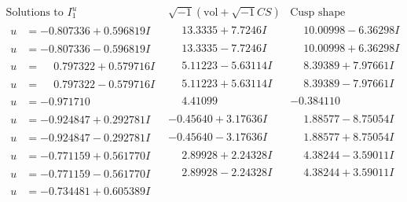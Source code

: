 \documentclass[1p]{elsarticle_modified}
\theoremstyle{definition}
\newcommand{\I}{\sqrt{-1}}
\begin{document}
$$\begin{array}{c|c|c}  
\text{Solutions to }I^u_{1}& \I (\text{vol} + \sqrt{-1}CS) & \text{Cusp shape}\\
 \hline 
\begin{aligned}
u &= -0.807336 + 0.596819 I\end{aligned}
 & \phantom{-}13.3335 + 7.7246 I & \phantom{-}10.00998 - 6.36298 I \\ \hline\begin{aligned}
u &= -0.807336 - 0.596819 I\end{aligned}
 & \phantom{-}13.3335 - 7.7246 I & \phantom{-}10.00998 + 6.36298 I \\ \hline\begin{aligned}
u &= \phantom{-}0.797322 + 0.579716 I\end{aligned}
 & \phantom{-}5.11223 - 5.63114 I & \phantom{-}8.39389 + 7.97661 I \\ \hline\begin{aligned}
u &= \phantom{-}0.797322 - 0.579716 I\end{aligned}
 & \phantom{-}5.11223 + 5.63114 I & \phantom{-}8.39389 - 7.97661 I \\ \hline\begin{aligned}
u &= -0.971710\phantom{ +0.000000I}\end{aligned}
 & \phantom{-}4.41099\phantom{ +0.000000I} & -0.384110\phantom{ +0.000000I} \\ \hline\begin{aligned}
u &= -0.924847 + 0.292781 I\end{aligned}
 & -0.45640 + 3.17636 I & \phantom{-}1.88577 - 8.75054 I \\ \hline\begin{aligned}
u &= -0.924847 - 0.292781 I\end{aligned}
 & -0.45640 - 3.17636 I & \phantom{-}1.88577 + 8.75054 I \\ \hline\begin{aligned}
u &= -0.771159 + 0.561770 I\end{aligned}
 & \phantom{-}2.89928 + 2.24328 I & \phantom{-}4.38244 - 3.59011 I \\ \hline\begin{aligned}
u &= -0.771159 - 0.561770 I\end{aligned}
 & \phantom{-}2.89928 - 2.24328 I & \phantom{-}4.38244 + 3.59011 I \\ \hline\begin{aligned}
u &= -0.734481 + 0.605389 I\end{aligned}

\end{array}$$
\end{document}
